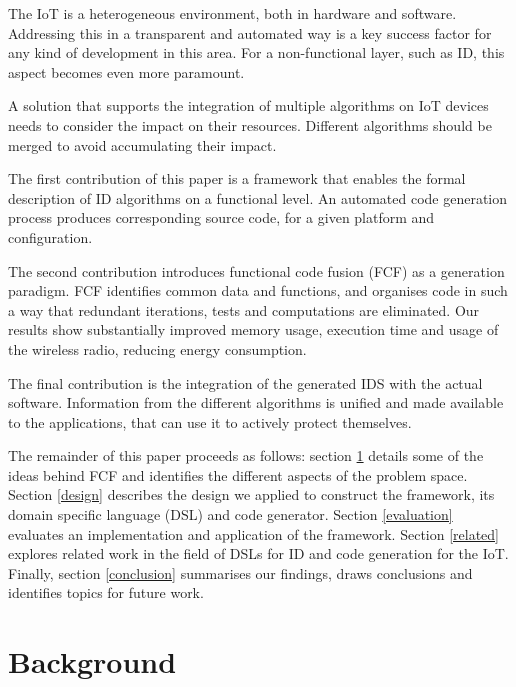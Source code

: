 \documentclass[conference]{IEEEtran}
\begin{document}

The IoT is a heterogeneous environment, both in hardware and software.
Addressing this in a transparent and automated way is a key success factor for
any kind of development in this area. For a non-functional layer, such as ID,
this aspect becomes even more paramount.

A solution that supports the integration of multiple algorithms on IoT devices
needs to consider the impact on their resources. Different algorithms should be
merged to avoid accumulating their impact.



The first contribution of this paper is a framework that enables the formal
description of ID algorithms on a functional level. An automated code
generation process produces corresponding source code, for a given platform and
configuration.


The second contribution introduces functional code fusion (FCF) as a generation
paradigm. FCF identifies common data and functions, and organises code in such
a way that redundant iterations, tests and computations are eliminated. Our
results show substantially improved memory usage, execution time and usage of
the wireless radio, reducing energy consumption.


The final contribution is the integration of the generated IDS with the actual
software. Information from the different algorithms is unified and made
available to the applications, that can use it to actively protect themselves.


The remainder of this paper proceeds as follows: section \ref{background}
details some of the ideas behind FCF and identifies the different aspects of
the problem space. Section \ref{design} describes the design we applied to
construct the framework, its domain specific language (DSL) and code generator.
Section \ref{evaluation} evaluates an implementation and application of the
framework. Section \ref{related} explores related work in the field of DSLs for
ID and code generation for the IoT. Finally, section \ref{conclusion}
summarises our findings, draws conclusions and identifies topics for future
work.

\section{Background}
\label{background}
\end{document}
